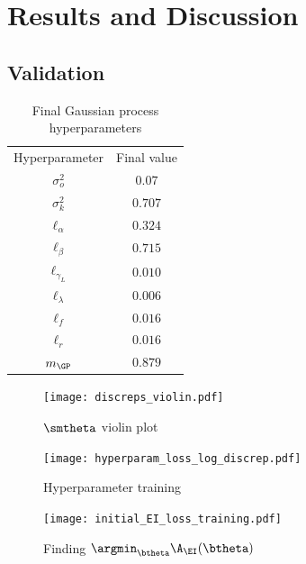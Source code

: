 \chapter{Results and Discussion}

\section{Validation}

\begin{table}[htbp]
    \caption{
        Final Gaussian process hyperparameters
    }
    \label{tab:trained_hps}
    \centering
    \begin{tabular}{c|c}
        Hyperparameter    & Final value \\
        $\sigma_o^2$      & $0.07$      \\
        $\sigma_k^2$      & $0.707$     \\
        $\ell_\alpha$     & $0.324$     \\
        $\ell_\beta$      & $0.715$     \\
        $\ell_{\gamma_L}$ & $0.010$     \\
        $\ell_\lambda$    & $0.006$     \\
        $\ell_f$          & $0.016$     \\
        $\ell_r$          & $0.016$     \\
        $m_\GP$           & $0.879$
    \end{tabular}
\end{table}

\begin{figure}[htbp]
    \centering
    \begin{minipage}[b]{0.33\textwidth}
        \centering
        \texttt{[image: discreps\_violin.pdf]}
        \caption{$\smtheta$ violin plot}
        \label{fig:violin}
    \end{minipage}
    \begin{minipage}[b]{0.66\textwidth}
        \centering
        \begin{minipage}[b]{\textwidth}
            \centering
            \texttt{[image: hyperparam\_loss\_log\_discrep.pdf]}
            \caption{Hyperparameter training}
            \label{fig:hyper_train}
        \end{minipage}
        \begin{minipage}[b]{\textwidth}
            \centering
            \texttt{[image: initial\_EI\_loss\_training.pdf]}
            \caption{Finding $\argmin_{\btheta}\A_\EI(\btheta)$}
            \label{fig:subEI}
        \end{minipage}
    \end{minipage}
\end{figure}


